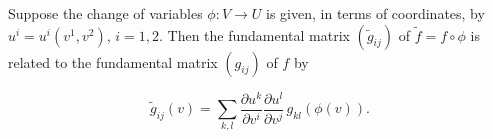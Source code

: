 Suppose the change of variables $\phi: V \to U$ is given, in terms of coordinates, by $u^i = u^i(v^1, v^2)$, $i = 1, 2$. Then the fundamental matrix $(\tilde{g}_{ij})$ of $\tilde{f} = f \circ \phi$ is related to the fundamental matrix $(g_{ij})$ of $f$ by

$$\tilde{g}_{ij}(v) = \sum_{k, l} \frac{\partial u^k}{\partial v^i} \frac{\partial u^l}{\partial v^j} \, g_{kl}(\phi(v)).$$
